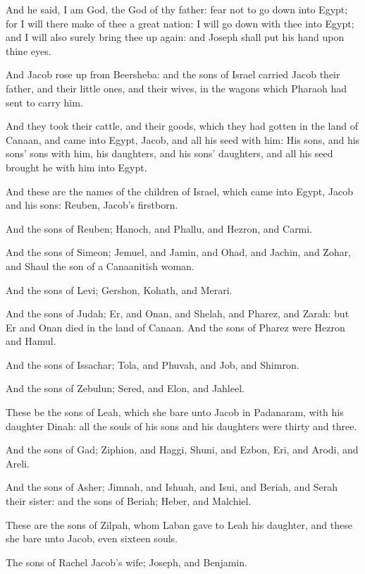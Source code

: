 \verse And he said, I am God, the God of thy father: fear not to go down into Egypt; for I will there make of thee a great nation: \verse I will go down with thee into Egypt; and I will also surely bring thee up again: and Joseph shall put his hand upon thine eyes.

\verse And Jacob rose up from Beersheba: and the sons of Israel carried Jacob their father, and their little ones, and their wives, in the wagons which Pharaoh had sent to carry him.

\verse And they took their cattle, and their goods, which they had gotten in the land of Canaan, and came into Egypt, Jacob, and all his seed with him: \verse His sons, and his sons' sons with him, his daughters, and his sons' daughters, and all his seed brought he with him into Egypt.

\verse And these are the names of the children of Israel, which came into Egypt, Jacob and his sons: Reuben, Jacob's firstborn.

\verse And the sons of Reuben; Hanoch, and Phallu, and Hezron, and Carmi.

\verse And the sons of Simeon; Jemuel, and Jamin, and Ohad, and Jachin, and Zohar, and Shaul the son of a Canaanitish woman.

\verse And the sons of Levi; Gershon, Kohath, and Merari.

\verse And the sons of Judah; Er, and Onan, and Shelah, and Pharez, and Zarah: but Er and Onan died in the land of Canaan. And the sons of Pharez were Hezron and Hamul.

\verse And the sons of Issachar; Tola, and Phuvah, and Job, and Shimron.

\verse And the sons of Zebulun; Sered, and Elon, and Jahleel.

\verse These be the sons of Leah, which she bare unto Jacob in Padanaram, with his daughter Dinah: all the souls of his sons and his daughters were thirty and three.

\verse And the sons of Gad; Ziphion, and Haggi, Shuni, and Ezbon, Eri, and Arodi, and Areli.

\verse And the sons of Asher; Jimnah, and Ishuah, and Isui, and Beriah, and Serah their sister: and the sons of Beriah; Heber, and Malchiel.

\verse These are the sons of Zilpah, whom Laban gave to Leah his daughter, and these she bare unto Jacob, even sixteen souls.

\verse The sons of Rachel Jacob's wife; Joseph, and Benjamin.

